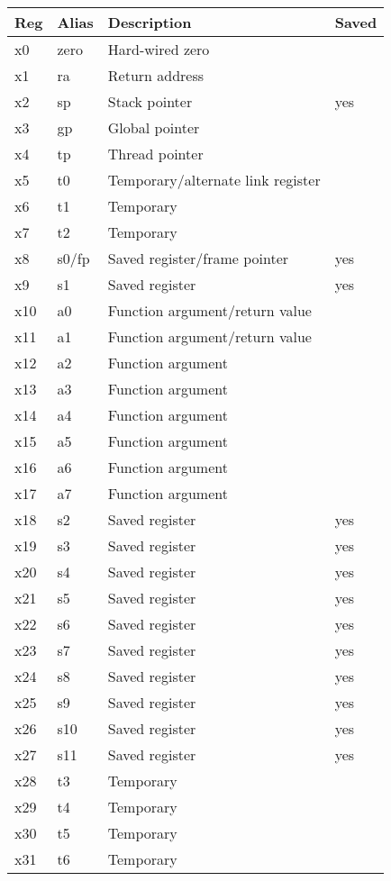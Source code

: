 \begin{center}
\begin{tabular}{|l|l|l|l|}
\hline
Reg	&	Alias			& Description						& Saved		\\
\hline
\hline
x0	&	zero			& Hard-wired zero					&			\\
x1	&	ra				& Return address					& 			\\
x2	&	sp				& Stack pointer						& yes		\\
x3	&	gp				& Global pointer					&			\\
x4	&	tp				& Thread pointer					&			\\
x5	&	t0				& Temporary/alternate link register	&			\\
x6	&	t1				& Temporary							&			\\
x7	&	t2				& Temporary							&			\\
x8	&	s0/fp			& Saved register/frame pointer		& yes		\\
x9	&	s1				& Saved register					& yes		\\
x10	&	a0				& Function argument/return value	& 			\\
x11	&	a1				& Function argument/return value	& 			\\
x12	&	a2				& Function argument					& 			\\
x13	&	a3				& Function argument					& 			\\
x14	&	a4				& Function argument					& 			\\
x15	&	a5				& Function argument					& 			\\
x16	&	a6				& Function argument					& 			\\
x17	&	a7				& Function argument					& 			\\
x18	&	s2				& Saved register					& yes		\\
x19	&	s3				& Saved register					& yes		\\
x20	&	s4				& Saved register					& yes		\\
x21	&	s5				& Saved register					& yes		\\
x22	&	s6				& Saved register					& yes		\\
x23	&	s7				& Saved register					& yes		\\
x24	&	s8				& Saved register					& yes		\\
x25	&	s9				& Saved register					& yes		\\
x26	&	s10				& Saved register					& yes		\\
x27	&	s11				& Saved register					& yes		\\
x28	&	t3				& Temporary							&			\\
x29	&	t4				& Temporary							&			\\
x30	&	t5				& Temporary							&			\\
x31	&	t6				& Temporary							&			\\
\hline
\end{tabular}
\end{center}



